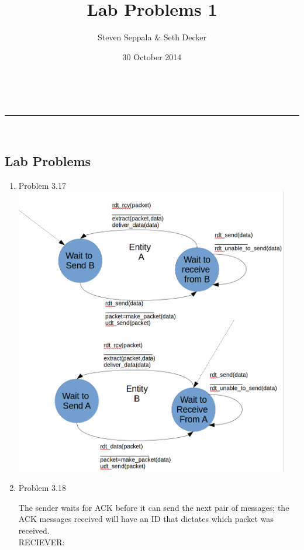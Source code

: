 \documentclass[a4paper,11pt]{article}
\makeatletter
\newcommand{\linia}{\rule{\linewidth}{0.5pt}}
\theoremstyle{mytheor}
\renewcommand{\maketitle}{
\begin{center}
\vspace{2ex}
{\huge \textsc{\@title}}
\vspace{1ex}
\\
\linia\\
\@author \hfill \@date
\vspace{4ex}
\end{center}
}
\makeatother
\begin{document}
\title{Lab Problems \textnumero{} 1}

\author{Steven Seppala \& Seth Decker}

\date{30 October 2014}

\maketitle

\begin{center} \section*{Lab Problems} \end{center}

\begin{enumerate}
\item {Problem 3.17} \\
    \includegraphics[width=120mm]{p17}
    \pagebreak
\item{Problem 3.18}
    \par
    The sender waits for ACK before it can send the next pair of messages; the ACK messages received will have an ID that dictates which packet was received.\\
    RECIEVER: \\

\end{enumerate}
\end{document}
